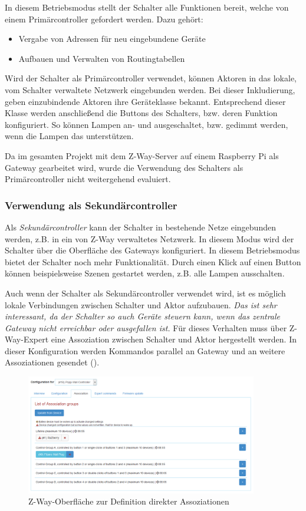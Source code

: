 In diesem Betriebsmodus stellt der Schalter alle Funktionen bereit, welche von einem Primärcontroller gefordert werden. Dazu gehört:
\begin{itemize}
	\item Vergabe von Adressen für neu eingebundene Geräte
	\item Aufbauen und Verwalten von Routingtabellen
\end{itemize}

Wird der Schalter als Primärcontroller verwendet, können Aktoren in das lokale, vom Schalter verwaltete Netzwerk eingebunden werden. Bei dieser Inkludierung, geben einzubindende Aktoren ihre Geräteklasse bekannt. Entsprechend dieser Klasse werden anschließend die Buttons des Schalters, bzw. deren Funktion konfiguriert. So können Lampen an- und ausgeschaltet, bzw. gedimmt werden, wenn die Lampen das unterstützen.

Da im gesamten Projekt mit dem Z-Way-Server auf einem Raspberry Pi als Gateway gearbeitet wird, wurde die Verwendung des Schalters als Primärcontroller nicht weitergehend evaluiert.

\subsubsection{Verwendung als Sekundärcontroller}
Als \emph{Sekundärcontroller} kann der Schalter in bestehende Netze eingebunden werden, z.B. in ein von Z-Way verwaltetes Netzwerk. In diesem Modus wird der Schalter über die Oberfläche des Gateways konfiguriert. In diesem Betriebsmodus bietet der Schalter noch mehr Funktionalität. Durch einen Klick auf einen Button können beispielsweise Szenen gestartet werden, z.B. alle Lampen ausschalten. 

Auch wenn der Schalter als Sekundärcontroller verwendet wird, ist es möglich lokale Verbindungen zwischen Schalter und Aktor aufzubauen. \emph{Das ist sehr interessant, da der Schalter so auch Geräte steuern kann, wenn das zentrale Gateway nicht erreichbar oder ausgefallen ist.} Für dieses Verhalten muss über Z-Way-Expert eine Assoziation zwischen Schalter und Aktor hergestellt werden. In dieser Konfiguration werden Kommandos parallel an Gateway und an weitere Assoziationen gesendet ().

\begin{figure}[h!]
	\centering
	\includegraphics[width=0.9\textwidth]{img/Sensorevaluation/PoppWallControllerSek.png}
	\caption{Z-Way-Oberfläche zur Definition direkter Assoziationen}
	\label{fig:sensorenPoppControllerSek}
\end{figure}

